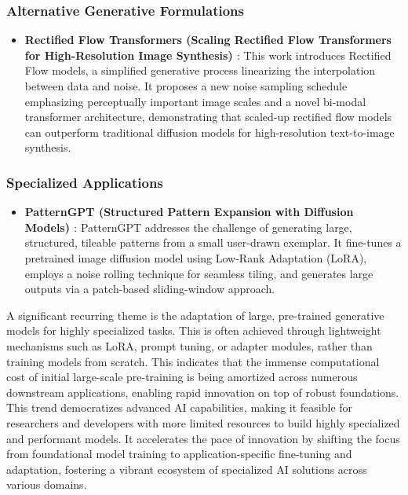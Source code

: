 \documentclass[a4paper]{article}
\begin{document}
\subsubsection{Alternative Generative Formulations}
\begin{itemize}
    \item \textbf{Rectified Flow Transformers (Scaling Rectified Flow Transformers for High-Resolution Image Synthesis) \cite{Esser2024ScalingRectifiedFlow}}: This work introduces Rectified Flow models, a simplified generative process linearizing the interpolation between data and noise. It proposes a new noise sampling schedule emphasizing perceptually important image scales and a novel bi-modal transformer architecture, demonstrating that scaled-up rectified flow models can outperform traditional diffusion models for high-resolution text-to-image synthesis.
\end{itemize}

\subsubsection{Specialized Applications}
\begin{itemize}
    \item \textbf{PatternGPT (Structured Pattern Expansion with Diffusion Models) \cite{Riso2024StructuredPattern}}: PatternGPT addresses the challenge of generating large, structured, tileable patterns from a small user-drawn exemplar. It fine-tunes a pretrained image diffusion model using Low-Rank Adaptation (LoRA), employs a noise rolling technique for seamless tiling, and generates large outputs via a patch-based sliding-window approach.
\end{itemize}

A significant recurring theme is the adaptation of large, pre-trained generative models for highly specialized tasks. This is often achieved through lightweight mechanisms such as LoRA, prompt tuning, or adapter modules, rather than training models from scratch. This indicates that the immense computational cost of initial large-scale pre-training is being amortized across numerous downstream applications, enabling rapid innovation on top of robust foundations. This trend democratizes advanced AI capabilities, making it feasible for researchers and developers with more limited resources to build highly specialized and performant models. It accelerates the pace of innovation by shifting the focus from foundational model training to application-specific fine-tuning and adaptation, fostering a vibrant ecosystem of specialized AI solutions across various domains.
\end{document}
